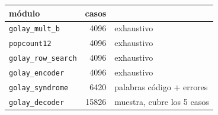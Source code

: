 \begin{tabular}{@{}lrl@{}}
\toprule
módulo & casos & \\
\midrule
\texttt{golay\_mult\_b} & 4096 & exhaustivo \\
\texttt{popcount12} & 4096 & exhaustivo \\
\texttt{golay\_row\_search} & 4096 & exhaustivo \\
\texttt{golay\_encoder} & 4096 & exhaustivo \\
\texttt{golay\_syndrome} & 6420 & palabras código $+$ errores \\
\texttt{golay\_decoder} & 15826 & muestra, cubre los 5 casos \\
\bottomrule
\end{tabular}
